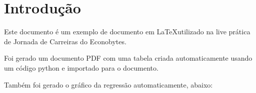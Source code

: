 \documentclass{article}
\begin{document}
    \section{Introdução}
    Este documento é um exemplo de documento em \LaTeX utilizado na live prática de Jornada de Carreiras do Econobytes.
    
    Foi gerado um documento PDF com uma tabela criada automaticamente usando um código python e importado para o documento.
    

    Também foi gerado o gráfico da regressão automaticamente, abaixo:
    \begin{center}
        
    \end{center}
\end{document}
